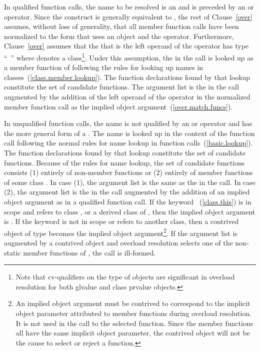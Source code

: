 \pnum
In qualified function calls, the name to be resolved is an
and is preceded by an
\tcode{->}
or
operator.
Since the
construct
is generally equivalent to
,
the rest of
Clause~\ref{over} assumes, without loss of generality, that all member
function calls have been normalized to the form that uses an
object and the
operator.
Furthermore, Clause~\ref{over} assumes that
the
that is the left operand of the
operator
has type ``\cv{}~''
where
denotes a class\footnote{Note that cv-qualifiers on the type of objects are
significant in overload
resolution for
both glvalue and class prvalue objects.}.
Under this
assumption, the
in the call is looked up as a
member function of
following the rules for looking up names in
classes~(\ref{class.member.lookup}).
The function declarations found by that lookup constitute the set of
candidate functions.
The argument list is the
in the call augmented by the addition of the left operand of
the
operator in the normalized member function call as the
implied object argument~(\ref{over.match.funcs}).

\pnum
In unqualified function calls, the name is not qualified by an
\tcode{->}
or
operator and has the more general form of a
.
The name is looked up in the context of the function
call following the normal rules for name lookup in function
calls~(\ref{basic.lookup}).
The function declarations found by that lookup constitute the
set of candidate functions.
Because of the rules for name lookup, the set of candidate functions
consists (1) entirely of non-member functions or (2) entirely of
member functions of some class
.
In case (1),
the argument list is
the same as the
in the call.
In case (2), the argument list is the
in the call augmented by the addition of an implied object
argument as in a qualified function call.
If the keyword
~(\ref{class.this}) is in scope and refers to
class
,
or a derived class of
,
then the implied object argument is
.
If the keyword
is not in
scope or refers to another class, then
a contrived object of type
becomes the implied object
argument\footnote{An implied object argument must be contrived to
correspond to the implicit object
parameter attributed to member functions during overload resolution.
It is not
used in
the call to the selected function.
Since the member functions all have the
same implicit
object parameter, the contrived object will not be the cause to select or
reject a
function.}.
If the argument list is augmented by a contrived object and overload
resolution selects one of the non-static member functions of
,
the call is ill-formed.

